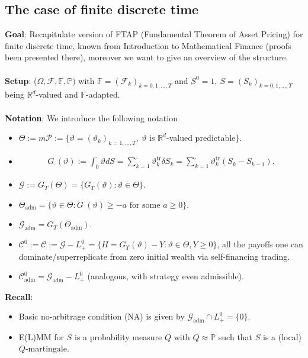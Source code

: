 \documentclass[12pt,a4paper, twoside]{article}
\theoremstyle{definition}
\newcommand{\PP}{\mathbb{P}} %
\begin{document}
\subsection{The case of finite discrete time}
\textbf{Goal}: Recapitulate version of FTAP (Fundamental Theorem of Asset Pricing) for finite discrete time, known from Introduction to Mathematical Finance (proofs been presented there), moreover we want to give an overview of the structure. 
\\\\
\textbf{Setup}: ($\Omega, \mathcal{F}, \mathbb{F}, \PP)$ with $\mathbb{F}= ( \mathcal{F}_k)_{k=0,1 , \dots , T}$ and $S^0=1, \ S=(S_k)_{k=0,1, \dots , T}$ being $\mathbb{R}^d$-valued and $\mathbb{F}$-adapted. 
\\\\
\textbf{Notation}: We introduce the following notation
\begin{itemize}
\item $\Theta := m \mathcal{P}:= \{ \vartheta = (\vartheta_k)_{k=1, \dots ,T}, \ \vartheta$ is $\mathbb{R}^d$-valued predictable$\}$.
\item 
\begin{align*}
G_\cdot (\vartheta):= \int_0^\cdot \vartheta dS = \sum_{k=1}^\cdot \vartheta_k^\text{tr} \delta S_k = \sum_{k=1}^\cdot \vartheta_k^\text{tr} (S_k-S_{k-1}). 
\end{align*}
\item $\mathcal{G}:= G_T( \Theta)= \{ G_T( \vartheta): \vartheta \in \Theta\}$. 
\item $\Theta_\text{adm} = \{ \vartheta \in \Theta : G_\cdot ( \vartheta) \geq -a \text{ for some } a \geq 0 \}$. 
\item $\mathcal{G}_\text{adm}= G_T( \Theta_\text{adm})$.  
\item $\mathcal{C}^0:= \mathcal{C}:= \mathcal{G}- L_+^0 = \{ H = G_T( \vartheta) - Y: \vartheta \in \Theta, Y \geq 0 \}$, all the payoffs one can dominate/superreplicate from zero initial wealth via self-financing trading. 
\item $\mathcal{C}_\text{adm}^0= \mathcal{G}_\text{adm}-L_+^0$ (analogous, with strategy even admissible). 
\end{itemize}
\textbf{Recall}: \begin{itemize}
\item Basic no-arbitrage condition (NA) is given by $\mathcal{G}_\text{adm} \cap L_+^0 = \{0 \}$. 
\item E(L)MM for $S$ is a probability measure $Q$ with $Q \approx \PP$ such that $S$ is a (local) $Q$-martingale. 
\end{itemize}
\end{document}
